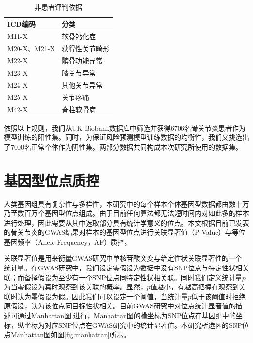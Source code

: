 \begin{table}[!h]
	\renewcommand{\arraystretch}{1.2}
	\centering\wuhao
	\caption{非患者评判依据} \label{ICD_exclude} \vspace{2mm}
	\begin{tabularx}{\textwidth} { 
   >{\centering\arraybackslash}X 
   >{\centering\arraybackslash}X }
	\toprule[1.5pt]
		ICD编码 & 分类 \\
	\midrule[1pt]
		M11-X & 软骨钙化症 \\
        M20-X、M21-X & 获得性关节畸形 \\
        M22-X & 髌骨功能异常 \\
        M23-X & 膝关节异常 \\
        M24-X & 其他关节异常 \\
        M25-X & 关节疼痛 \\
        M42-X & 脊柱软骨病 \\
	\bottomrule[1.5pt]
	\end{tabularx}
\end{table}

依照以上规则，我们从UK Biobank数据库中筛选并获得6706名骨关节炎患者作为模型训练的阳性集。同时，为保证风险预测模型训练数据的均衡性，我们又挑选出了7000名正常个体作为阴性集。两部分数据共同构成本次研究所使用的数据集。

\section{基因型位点质控}

人类基因组具有复杂性与多样性，本研究中的每个样本个体基因型数据都由数十万乃至数百万个基因型位点组成。由于目前任何算法都无法短时间内对如此多的样本进行处理，因此需要从其中选取部分具有统计学意义的位点。本文根据目前已发表的骨关节炎的GWAS结果\cite{zengini_genome-wide_2018,arcogen_consortium_identification_2019}对样本的基因型位点进行关联显著值（P-Value）与等位基因频率（Allele Frequency，AF）质控。

关联显著值是用来衡量GWAS研究中单核苷酸突变与给定性状关联显著性的一个统计量。在GWAS研究中，我们设定零假设为数据中没有SNP位点与特定性状相关联；而备择假设为至少有一个SNP位点同特定性状相关联。同时我们定义统计量$p$为当零假设为真时观察到该关联的概率。显然，$p$值越小，有越高把握在观察到关联时认为零假设为假。因此我们可以设定一个阈值，当统计量$p$低于该阈值时拒绝原假设，认为该位点同目标性状相关。\cite{chen_revisiting_2021}目前GWAS研究中对位点统计显著值的描述可通过Manhattan图
进行，Manhattan图的横坐标为SNP位点在基因组中的坐标，纵坐标为对应SNP位点在GWAS研究中的统计显著值。本研究所选区的SNP位点Manhattan图如图\ref{fig:manhattan}所示。

